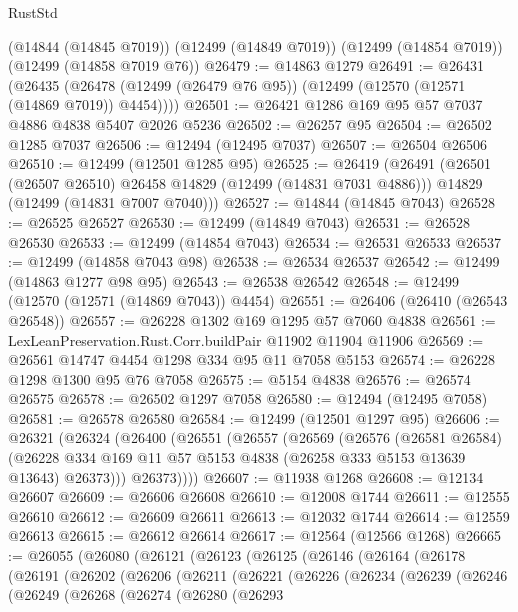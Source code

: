 \begin{lexlean}{RustStd}
\begin{coremodule}
    (@14844 (@14845 @7019))
    (@12499 (@14849 @7019))
    (@12499 (@14854 @7019))
    (@12499 (@14858 @7019 @76))
@26479 := @14863 @1279
@26491 := @26431
    (@26435 (@26478 (@12499 (@26479 @76 @95)) (@12499 (@12570 (@12571 (@14869 @7019)) @4454))))
@26501 := @26421 @1286 @169 @95 @57 @7037 @4886 @4838 @5407 @2026 @5236
@26502 := @26257 @95
@26504 := @26502 @1285 @7037
@26506 := @12494 (@12495 @7037)
@26507 := @26504 @26506
@26510 := @12499 (@12501 @1285 @95)
@26525 := @26419
    (@26491
      (@26501 (@26507 @26510) @26458 @14829 (@12499 (@14831 @7031 @4886)))
      @14829
      (@12499 (@14831 @7007 @7040)))
@26527 := @14844 (@14845 @7043)
@26528 := @26525 @26527
@26530 := @12499 (@14849 @7043)
@26531 := @26528 @26530
@26533 := @12499 (@14854 @7043)
@26534 := @26531 @26533
@26537 := @12499 (@14858 @7043 @98)
@26538 := @26534 @26537
@26542 := @12499 (@14863 @1277 @98 @95)
@26543 := @26538 @26542
@26548 := @12499 (@12570 (@12571 (@14869 @7043)) @4454)
@26551 := @26406 (@26410 (@26543 @26548))
@26557 := @26228 @1302 @169 @1295 @57 @7060 @4838
@26561 := LexLeanPreservation.Rust.Corr.buildPair @11902 @11904 @11906
@26569 := @26561 @14747 @4454 @1298 @334 @95 @11 @7058 @5153
@26574 := @26228 @1298 @1300 @95 @76 @7058
@26575 := @5154 @4838
@26576 := @26574 @26575
@26578 := @26502 @1297 @7058
@26580 := @12494 (@12495 @7058)
@26581 := @26578 @26580
@26584 := @12499 (@12501 @1297 @95)
@26606 := @26321
    (@26324
      (@26400
        (@26551
          (@26557
            (@26569
              (@26576
                (@26581 @26584)
                (@26228 @334 @169 @11 @57 @5153 @4838 (@26258 @333 @5153 @13639 @13643) @26373)))
            @26373))))
@26607 := @11938 @1268
@26608 := @12134 @26607
@26609 := @26606 @26608
@26610 := @12008 @1744
@26611 := @12555 @26610
@26612 := @26609 @26611
@26613 := @12032 @1744
@26614 := @12559 @26613
@26615 := @26612 @26614
@26617 := @12564 (@12566 @1268)
@26665 := @26055
    (@26080
      (@26121
        (@26123
          (@26125
            (@26146
              (@26164
                (@26178
                  (@26191
                    (@26202
                      (@26206
                        (@26211
                          (@26221
                            (@26226
                              (@26234
                                (@26239
                                  (@26246
                                    (@26249
                                      (@26268
                                        (@26274
                                          (@26280
                                            (@26293

\end{coremodule}
\end{lexlean}
